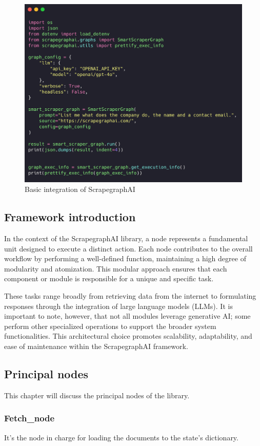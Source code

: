 \begin{figure}[h!]
    \centering
    \includegraphics[width=0.75\linewidth]{Assets/scrapegraph_integration.png}
    \caption{Basic integration of ScrapegraphAI }
    \label{fig:scrapegraph-script}
\end{figure}

\subsection{Framework introduction}

In the context of the ScrapegraphAI  library, a node represents a fundamental unit designed to execute a distinct action. Each node contributes to the overall workflow by performing a well-defined function, maintaining a high degree of modularity and atomization. This modular approach ensures that each component or module is responsible for a unique and specific task.

These tasks range broadly from retrieving data from the internet to formulating responses through the integration of large language models (LLMs). It is important to note, however, that not all modules leverage generative AI; some perform other specialized operations to support the broader system functionalities. This architectural choice promotes scalability, adaptability, and ease of maintenance within the ScrapegraphAI  framework.
\subsection{Principal nodes}
This chapter will discuss the principal nodes of the library. 
\subsubsection{Fetch\_node}
It's the node in charge for loading the documents to the state's dictionary.

